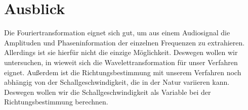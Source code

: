\section{Ausblick} %
Die Fouriertransformation eignet sich gut, um aus einem Audiosignal die Amplituden und Phaseninformation der einzelnen Frequenzen zu extrahieren. Allerdings ist sie hierfür nicht die einzige Möglichkeit. Deswegen wollen wir untersuchen, in wieweit sich die Wavelettransformation für unser Verfahren eignet. Außerdem ist die Richtungsbestimmung mit unserem Verfahren noch abhängig von der Schallgeschwindigkeit, die in der Natur variieren kann. Deswegen wollen wir die Schallgeschwindigkeit als Variable bei der Richtungsbestimmung berechnen.
